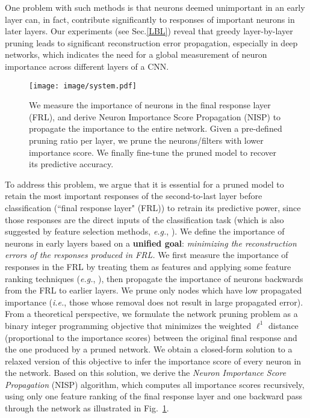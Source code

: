\documentclass[10pt,twocolumn,letterpaper]{article}
\def\eg{\emph{e.g.}}
\def\ie{\emph{i.e.}}
\begin{document}
One problem with such methods is that neurons deemed unimportant in an early layer can, in fact, contribute significantly to responses of important neurons in later layers. Our experiments (see Sec.\ref{LBL}) reveal that greedy layer-by-layer pruning leads to significant reconstruction error propagation, especially in deep networks, which indicates the need for a global measurement of neuron importance across different layers of a CNN.

\begin{figure}[t]
\begin{center}
   \texttt{[image: image/system.pdf]}
\end{center}
   \caption{We measure the importance of neurons in the final response layer (FRL), and derive Neuron Importance Score Propagation (NISP) to propagate the importance to the entire network. Given a pre-defined pruning ratio per layer, we prune the neurons/filters with lower importance score. We finally fine-tune the pruned model to recover its predictive accuracy.}
\label{fig:spe}
\end{figure}

To address this problem, we argue that it is essential for a pruned model to retain the most important responses of the second-to-last layer before classification (``final response layer" (FRL)) to retrain its predictive power, since those responses are the direct inputs of the classification task (which is also suggested by feature selection methods, \eg, \cite{Roffo_2015_ICCV}). We define the importance of neurons in early layers based on a \textbf{unified goal}: \emph{minimizing the reconstruction errors of the responses produced in FRL.} 
We first measure the importance of responses in the FRL by treating them as features and applying some feature ranking techniques (\eg, \cite{Roffo_2015_ICCV}), then propagate the importance of neurons backwards from the FRL to earlier layers. We prune only nodes which have low propagated importance (\ie, those whose removal does not result in large propagated error).  From a theoretical perspective, we formulate the network pruning problem as a binary integer programming objective that minimizes the weighted $\ell^1$ distance (proportional to the importance scores) between the original final response and the one produced by a pruned network. 
We obtain a closed-form solution to a relaxed version of this objective to infer the importance score of every neuron in the network. 
Based on this solution, we derive the \textit{Neuron Importance Score Propagation} (NISP) algorithm, which computes all importance scores recursively, using only one feature ranking of the final response layer and one backward pass through the network as illustrated in Fig.~\ref{fig:spe}.
\end{document}
